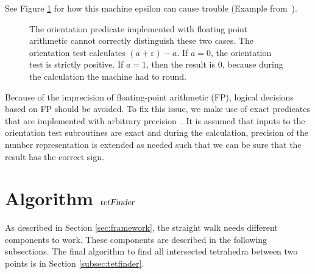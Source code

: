 \documentclass[../thesis.tex]{subfiles}
\begin{document}
See Figure \ref{fig:floatingpoint} for how this machine epsilon can cause trouble (Example from~\cite{Marek}).
\begin{figure}[htb]
  \centering
  \def\svgwidth{20em}
  
  \caption{The orientation predicate implemented with floating point arithmetic cannot correctly distinguish these two cases.
  The orientation test calculates $(a+\varepsilon)-a$. If $a=0$, the orientation test is strictly positive.
  If $a=1$, then the result is $0$, because during the calculation the machine had to round.
  }\label{fig:floatingpoint}
\end{figure}
Because of the imprecision of floating-point arithmetic (FP), logical decisions
based on FP should be avoided.
To fix this issue, we make use of exact predicates that are implemented with arbitrary precision~\cite{RichardShewchuk1997}.
It is assumed that inputs to the orientation test subroutines are exact and during the calculation,
precision of the number representation is extended as needed such that
we can be sure that the result has the correct sign.


\section{Algorithm $\textsl{tetFinder}$}
As described in Section \ref{sec:framework}, the straight walk needs different
components to work. These components are described in the following subsections.
The final algorithm to find all intersected tetrahedra between two points is in Section \ref{subsec:tetfinder}.
\end{document}

